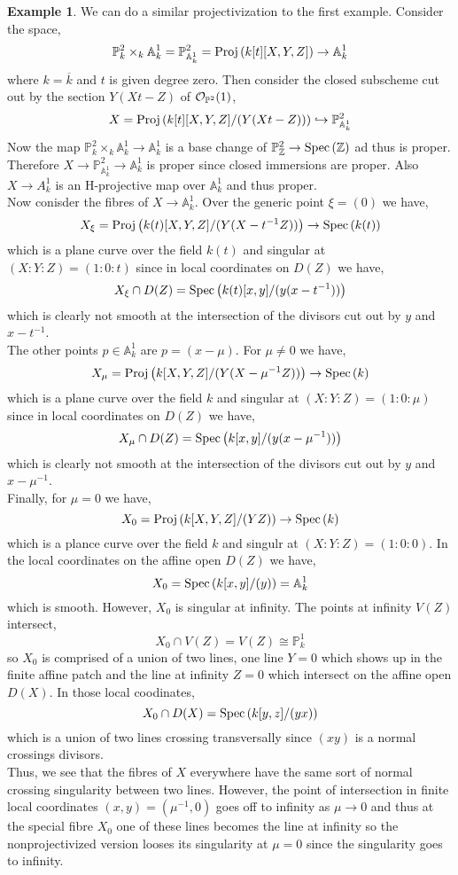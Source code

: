 \documentclass[12pt]{extarticle}
\newcommand{\Z}{\mathbb{Z}}
\theoremstyle{definition}
\newtheorem{example}[theorem]{Example}
\renewcommand{\P}{\mathbb{P}}
\newcommand{\embed}{\hookrightarrow}
\newcommand{\A}{\mathbb{A}}
\begin{document}
\begin{example}
We can do a similar projectivization to the first example. Consider the space,
\[ \P^2_k \times_k \A^1_k = \P^2_{\A^1_k} = \Proj{k[t][X,Y,Z]} \to \A^1_k \]
where $k = \overline{k}$ and $t$ is given degree zero. Then consider the closed subscheme cut out by the section $Y(X t - Z)$ of $\struct{\P^2}(1)$,
\[ X = \Proj{k[t][X, Y, Z]/(Y(X t - Z))} \embed \P^2_{\A^1_k} \]
Now the map $\P^2_k \times_k \A^1_k \to \A^1_k$ is a base change of $\P^2_\Z \to \Spec{\Z}$ ad thus is proper. Therefore $X \to \P^2_{\A^1_k} \to \A^1_k$ is proper since closed immersions are proper. Also $X \to A^1_k$ is an H-projective map over $\A^1_k$ and thus proper. 
\bigskip\\
Now conisder the fibres of $X \to \A^1_k$. Over the generic point $\xi = (0)$ we have,
\[ X_\xi = \mathrm{Proj}\left(k(t)[X, Y, Z]/(Y (X  - t^{-1} Z))\right) \to \mathrm{Spec}\left(k(t)\right) \]
which is a plane curve over the field $k(t)$ and singular at $(X : Y : Z) = (1 : 0 : t)$ since in local coordinates on $D(Z)$ we have,
\[ X_\xi \cap D(Z) = \mathrm{Spec}\left(k(t)[x, y]/(y (x - t^{-1} ))\right) \]
which is clearly not smooth at the intersection of the divisors cut out by $y$ and $x - t^{-1}$.
\bigskip\\
The other points $p \in \A^1_k$ are $p = (x - \mu)$. For $\mu \neq 0$ we have,
\[ X_\mu = \mathrm{Proj}\left(k[X, Y, Z]/(Y (X - \mu^{-1} Z))\right) \to \mathrm{Spec}\left(k\right) \]
which is a plane curve over the field $k$ and singular at $(X : Y : Z) = (1 : 0 : \mu)$ since in local coordinates on $D(Z)$ we have,
\[ X_\mu \cap D(Z) = \mathrm{Spec}\left(k[x, y] / (y (x - \mu^{-1}))\right) \]
which is clearly not smooth at the intersection of the divisors cut out by $y$ and $x - \mu^{-1}$.
\bigskip\\
Finally, for $\mu = 0$ we have,
\[ X_0 = \mathrm{Proj}\left(k[X, Y, Z]/(Y Z)\right) \to \mathrm{Spec}\left(k\right) \]
which is a plance curve over the field $k$ and singulr at $(X : Y : Z) = (1 : 0 : 0)$. In the local coordinates on the affine open $D(Z)$ we have,
\[ X_0 = \Spec{k[x, y]/(y)} = \A^1_k \]
which is smooth. However, $X_0$ is singular at infinity. The points at infinity $V(Z)$ intersect,
\[ X_0 \cap V(Z) = V(Z) \cong \P^1_k \]
so $X_0$ is comprised of a union of two lines, one line $Y = 0$ which shows up in the finite affine patch and the line at infinity $Z = 0$ which intersect on the affine open $D(X)$. In those local coodinates,
\[ X_0 \cap D(X) = \mathrm{Spec}\left(k[y, z]/(yx)\right) \]
which is a union of two lines crossing transversally since $(x y)$ is a normal crossings divisors. 
\bigskip\\
Thus, we see that the fibres of $X$ everywhere have the same sort of normal crossing singularity between two lines. However, the point of intersection in finite local coordinates $(x, y) = (\mu^{-1}, 0)$ goes off to infinity as $\mu \to 0$ and thus at the special fibre $X_0$ one of these lines becomes the line at infinity so the nonprojectivized version looses its singularity at $\mu = 0$ since the singularity goes to infinity. 
\end{example}
\end{document}
